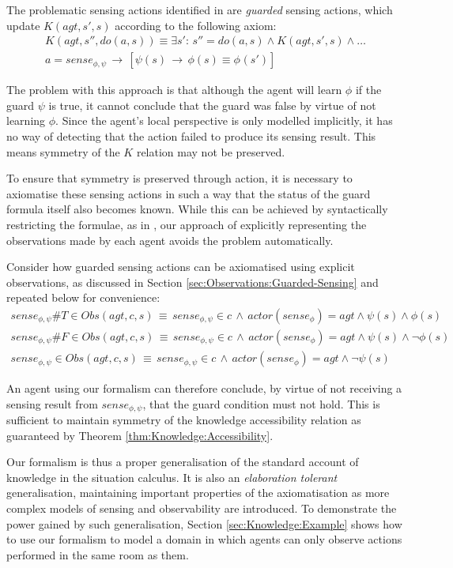 The problematic sensing actions identified in \citep{Petrick06thesis}
are \emph{guarded} sensing actions, which update $K(agt,s',s)$ according
to the following axiom:\begin{gather*}
K(agt,s'',do(a,s))\equiv\exists s':\, s''=do(a,s)\wedge K(agt,s',s)\wedge\dots\\
a=sense_{\phi,\psi}\,\rightarrow\,\left[\psi(s)\,\rightarrow\,\phi(s)\equiv\phi_{}(s')\right]\end{gather*}


The problem with this approach is that although the agent will learn
$\phi$ if the guard $\psi$ is true, it cannot conclude that the
guard was false by virtue of not learning $\phi$. Since the agent's
local perspective is only modelled implicitly, it has no way of detecting
that the action failed to produce its sensing result. This means symmetry
of the $K$ relation may not be preserved.

To ensure that symmetry is preserved through action, it is necessary
to axiomatise these sensing actions in such a way that the status
of the guard formula itself also becomes known. While this can be
achieved by syntactically restricting the formulae, as in \citep{Petrick06thesis},
our approach of explicitly representing the observations made by each
agent avoids the problem automatically.

Consider how guarded sensing actions can be axiomatised using explicit
observations, as discussed in Section \ref{sec:Observations:Guarded-Sensing}
and repeated below for convenience:\begin{gather*}
sense_{\phi,\psi}\#T\in Obs(agt,c,s)\,\equiv\, sense_{\phi,\psi}\in c\,\wedge\, actor(sense_{\phi})=agt\wedge\psi(s)\wedge\phi(s)\\
sense_{\phi,\psi}\#F\in Obs(agt,c,s)\,\equiv\, sense_{\phi,\psi}\in c\,\wedge\, actor(sense_{\phi})=agt\wedge\psi(s)\wedge\neg\phi(s)\\
sense_{\phi,\psi}\in Obs(agt,c,s)\,\equiv\, sense_{\phi,\psi}\in c\,\wedge\, actor(sense_{\phi})=agt\wedge\neg\psi(s)\end{gather*}


An agent using our formalism can therefore conclude, by virtue of
not receiving a sensing result from $sense_{\phi,\psi}$, that the
guard condition must not hold. This is sufficient to maintain symmetry
of the knowledge accessibility relation as guaranteed by Theorem \ref{thm:Knowledge:Accessibility}.

Our formalism is thus a proper generalisation of the standard account
of knowledge in the situation calculus. It is also an \emph{elaboration
tolerant} generalisation, maintaining important properties of the
axiomatisation as more complex models of sensing and observability
are introduced. To demonstrate the power gained by such generalisation,
Section \ref{sec:Knowledge:Example} shows how to use our formalism
to model a domain in which agents can only observe actions performed
in the same room as them.

